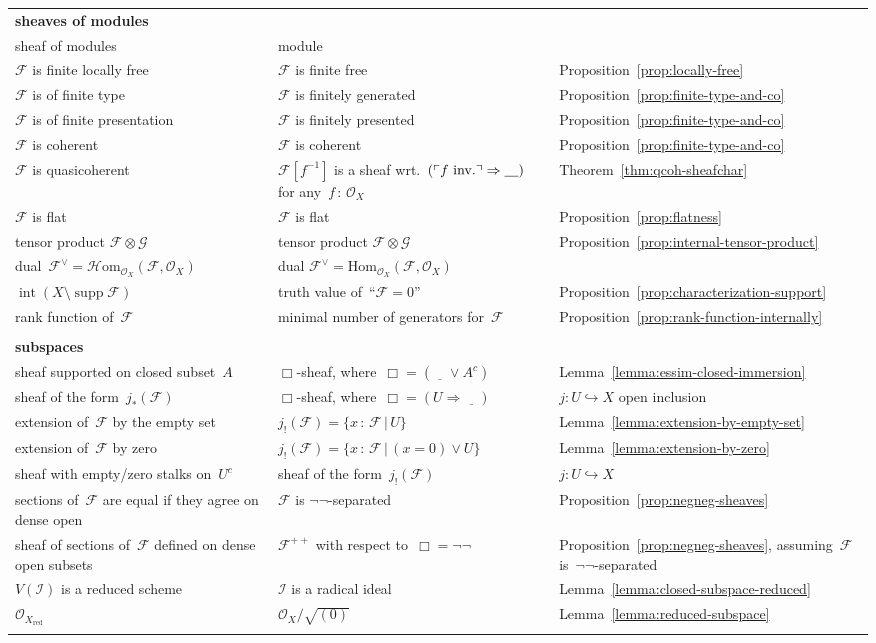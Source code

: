 \documentclass[10pt]{amsart}
\makeatletter
\theoremstyle{definition}
\theoremstyle{plain}
\theoremstyle{remark}
\newcommand{\F}{\mathcal{F}}
\renewcommand{\G}{\mathcal{G}}
\renewcommand{\O}{\mathcal{O}}
\newcommand{\I}{\mathcal{I}}
\newcommand{\Hom}{\mathrm{Hom}}
\newcommand{\HOM}{\mathcal{H}\mathrm{om}}
\newcommand{\placeholder}{\underline{\quad}}
\DeclareMathOperator{\Int}{int}
\DeclareMathOperator{\supp}{supp}
\newcommand{\?}{\,{:}\,}
\renewcommand{\_}{\mathpunct{.}\,}
\newcommand{\speak}[1]{\ulcorner\text{\textnormal{#1}}\urcorner}
\newcommand{\inv}{inv.\@}
\makeatother
\begin{document}
{\begin{longtable}{@{}p{5cm}@{\qquad}p{5cm}@{\qquad}p{3cm}@{}}
  \textbf{sheaves of modules} \\
  sheaf of modules & module \\
  $\F$ is finite locally free & $\F$ is finite free & Proposition~\ref{prop:locally-free} \\
  $\F$ is of finite type & $\F$ is finitely generated & Proposition~\ref{prop:finite-type-and-co} \\
  $\F$ is of finite presentation & $\F$ is finitely presented & Proposition~\ref{prop:finite-type-and-co} \\
  $\F$ is coherent & $\F$ is coherent & Proposition~\ref{prop:finite-type-and-co} \\
  $\F$ is quasicoherent & $\F[f^{-1}]$ is a sheaf wrt.\@~$(\speak{$f$ \inv} \Rightarrow \placeholder)$ for any~$f\?\O_X$ & Theorem~\ref{thm:qcoh-sheafchar} \\
  $\F$ is flat & $\F$ is flat & Proposition~\ref{prop:flatness} \\
  tensor product $\F \otimes \G$ & tensor product $\F \otimes \G$ & Proposition~\ref{prop:internal-tensor-product} \\
  dual~$\F^\vee = \HOM_{\O_X}(\F,\O_X)$ & dual $\F^\vee = \Hom_{\O_X}(\F,\O_X)$ \\
  $\Int(X \setminus \supp\F)$ & truth value of~``$\F = 0$'' & Proposition~\ref{prop:characterization-support} \\
  rank function of~$\F$ & minimal number of generators for~$\F$ & Proposition~\ref{prop:rank-function-internally} \\\\

  \textbf{subspaces} \\
  sheaf supported on closed subset~$A$ & $\Box$-sheaf, where~$\Box = (\placeholder \vee A^c)$ & Lemma~\ref{lemma:essim-closed-immersion} \\
  sheaf of the form~$j_*(\F)$ & $\Box$-sheaf, where~$\Box = (U \Rightarrow
  \placeholder)$ & $j : U \hookrightarrow X$ open inclusion \\
  extension of~$\F$ by the empty set & $j_!(\F) = \{ x\?\F \,|\, U \}$ & Lemma~\ref{lemma:extension-by-empty-set} \\
  extension of~$\F$ by zero & $j_!(\F) = \{ x\?\F \,|\, (x = 0) \vee U \}$ & Lemma~\ref{lemma:extension-by-zero} \\
  sheaf with empty/zero stalks on~$U^c$ & sheaf of the form~$j_!(\F)$ & $j : U
  \hookrightarrow X$ \\
  sections of~$\F$ are equal if they agree on dense open & $\F$ is $\neg\neg$-separated & Proposition~\ref{prop:negneg-sheaves} \\
  sheaf of sections of~$\F$ defined on dense open subsets & $\F^{++}$ with respect to~$\Box = \neg\neg$ & Proposition~\ref{prop:negneg-sheaves}, assuming~$\F$ is~$\neg\neg$-separated \\
  $V(\I)$ is a reduced scheme & $\I$ is a radical ideal & Lemma~\ref{lemma:closed-subspace-reduced} \\
  $\O_{X_\mathrm{red}}$ & $\O_X/\sqrt{(0)}$ & Lemma~\ref{lemma:reduced-subspace} \\\\


\end{longtable}}
\end{document}
